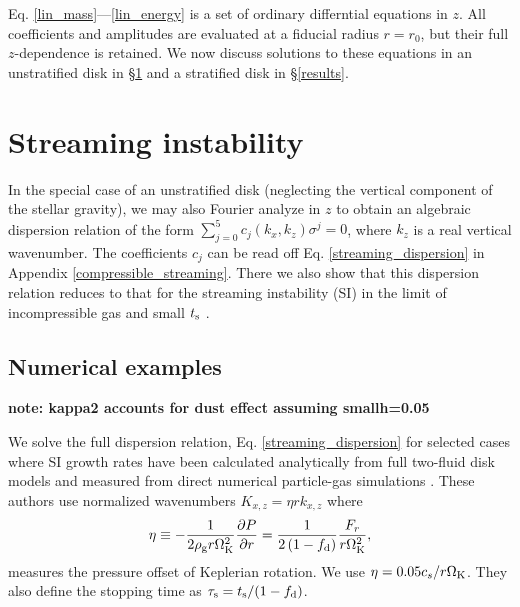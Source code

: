 
Eq. \ref{lin_mass}---\ref{lin_energy} is a set of ordinary
differntial equations in $z$. All coefficients and amplitudes are
evaluated at a fiducial radius $r=r_0$, but their full $z$-dependence
is retained. We now discuss solutions to these equations in an unstratified disk 
in \S\ref{si} and a stratified disk in \S\ref{results}.  
 

\section{Streaming instability}\label{si}
In the special case of an unstratified disk (neglecting the vertical
component of the stellar gravity), we may also Fourier analyze in $z$
to obtain an algebraic dispersion relation of the form  
$\sum_{j=0}^{5}c_j(k_x,k_z)\sigma^j = 0$, where $k_z$ is a real
vertical wavenumber. The coefficients $c_j$ can be read 
off Eq. \ref{streaming_dispersion} in  Appendix \ref{compressible_streaming}. 
There we also show that this dispersion relation reduces to that for
the streaming instability (SI) in the limit of incompressible gas and small
$t_\mathrm{s}$ \citep{youdin05a,jacquet11}.   
 
\subsection{Numerical examples}

{\bf note: kappa2 accounts for dust effect assuming smallh=0.05}

We solve the full dispersion relation, Eq. \ref{streaming_dispersion} for selected cases where SI  
growth rates have been 
calculated analytically from full two-fluid disk models and measured 
from direct numerical particle-gas simulations 
\citep[namely][]{youdin07b,bai10b}. These authors use normalized
wavenumbers $K_{x,z} = \eta r k_{x,z}$ where
\begin{align} 
  \eta \equiv -\frac{1}{2\rho_\mathrm{g} r\Omega_{\rm K}^2}\frac{\partial P}{\partial r} = 
  \frac{1}{2\left(1-f_\mathrm{d}\right)}\frac{F_r}{r\Omega_{\rm K}^2}, 
\end{align} 
measures the pressure offset of Keplerian rotation. We use
$\eta=0.05c_s/r\Omega_{\rm K}$. They also define the stopping time as
$\tau_\mathrm{s}=t_\mathrm{s}/(1-f_\mathrm{d})$.  

